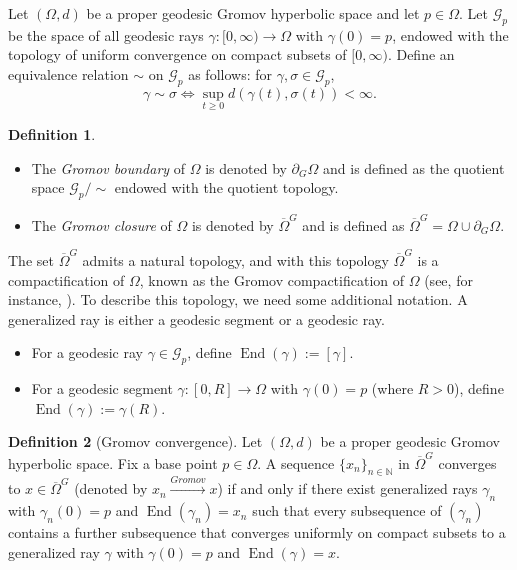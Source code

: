 \documentclass[a4paper,12pt]{amsart}
\theoremstyle{definition}
\newtheorem{defn}{Definition}[section]
\newcounter {own}
\begin{document}
Let $(\Omega,d)$ be a proper geodesic Gromov hyperbolic space and let $p\in \Omega$. Let $\mathcal{G}_{p}$ be the space of all geodesic rays $\gamma:[0,\infty)\to \Omega$ with $\gamma(0)=p$, endowed with the topology of uniform convergence on compact subsets of $[0,\infty)$. Define an equivalence relation $\sim$ on $\mathcal{G}_{p}$ as follows: for $\gamma,\sigma\in \mathcal{G}_{p}$,
$$\gamma\sim \sigma \iff \sup_{t\ge 0} d(\gamma(t),\sigma(t))< \infty.$$

\begin{defn}
	\begin{itemize}
		\item[(1)] The {\it Gromov boundary} of $\Omega$ is denoted by $\partial_{G} \Omega$ and is defined as the quotient space $\mathcal{G}_{p}/\sim$ endowed with the quotient topology.
		\item[(2)] The {\it Gromov closure} of $\Omega$ is denoted by $\overline{\Omega}^{G}$ and is defined as $\overline{\Omega}^{G}=\Omega\cup \partial_{G}\Omega$.
	\end{itemize}
\end{defn}

The set $\overline{\Omega}^{G}$ admits a natural topology, and with this topology $\overline{\Omega}^{G}$ is a compactification of $\Omega$, known as the Gromov compactification of $\Omega$ (see, for instance, \cite[Chapter III.H.3, Proposition 3.7]{Bridson-book}). To describe this topology, we need some additional notation. A generalized ray is either a geodesic segment or a geodesic ray.
\begin{itemize}
	\item For a geodesic ray $\gamma \in \mathcal{G}_p$, define $\operatorname{End}(\gamma):=[\gamma]$.
	\item For a geodesic segment $\gamma:[0,R]\to \Omega$ with $\gamma(0)=p$ (where $R>0$), define $\operatorname{End}(\gamma):=\gamma(R)$.
\end{itemize}

\begin{defn}[Gromov convergence]\label{Gromov topology}
	Let $(\Omega,d)$ be a proper geodesic Gromov hyperbolic space. Fix a base point $p\in \Omega$. A sequence $\{x_n\}_{n\in \mathbb{N}}$ in $\overline{\Omega}^G$ converges to $x\in \overline{\Omega}^G$ (denoted by $x_n \stackrel{Gromov}\longrightarrow x$) if and only if there exist generalized rays $\gamma_n$ with $\gamma_n(0)=p$ and $\operatorname{End}(\gamma_n)=x_n$ such that every subsequence of $(\gamma_n)$ contains a further subsequence that converges uniformly on compact subsets to a generalized ray $\gamma$ with $\gamma(0)=p$ and $\operatorname{End}(\gamma)=x$.
\end{defn}
\end{document}

